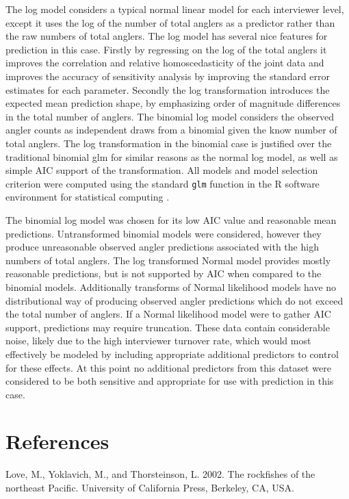 \documentclass[12pt,]{article}
\begin{document}
The log model considers a typical normal linear model for each
interviewer level, except it uses the log of the number of total anglers
as a predictor rather than the raw numbers of total anglers. The log
model has several nice features for prediction in this case. Firstly by
regressing on the log of the total anglers it improves the correlation
and relative homoscedasticity of the joint data and improves the
accuracy of sensitivity analysis by improving the standard error
estimates for each parameter. Secondly the log transformation introduces
the expected mean prediction shape, by emphasizing order of magnitude
differences in the total number of anglers. The binomial log model
considers the observed angler counts as independent draws from a
binomial given the know number of total anglers. The log transformation
in the binomial case is justified over the traditional binomial glm for
similar reasons as the normal log model, as well as simple AIC support
of the transformation. All models and model selection criterion were
computed using the standard \verb|glm| function in the R software
environment for statistical computing \cite{rBase}.

The binomial log model was chosen for its low AIC value and reasonable
mean predictions. Untransformed binomial models were considered, however
they produce unreasonable observed angler predictions associated with
the high numbers of total anglers. The log transformed Normal model
provides mostly reasonable predictions, but is not supported by AIC when
compared to the binomial models. Additionally transforms of Normal
likelihood models have no distributional way of producing observed
angler predictions which do not exceed the total number of anglers. If a
Normal likelihood model were to gather AIC support, predictions may
require truncation. These data contain considerable noise, likely due to
the high interviewer turnover rate, which would most effectively be
modeled by including appropriate additional predictors to control for
these effects. At this point no additional predictors from this dataset
were considered to be both sensitive and appropriate for use with
prediction in this case.

\newpage

\thispagestyle{empty}

\section*{References}\label{references}

Love, M., Yoklavich, M., and Thorsteinson, L. 2002. The rockfishes of
the northeast Pacific. University of California Press, Berkeley, CA,
USA.
\end{document}
